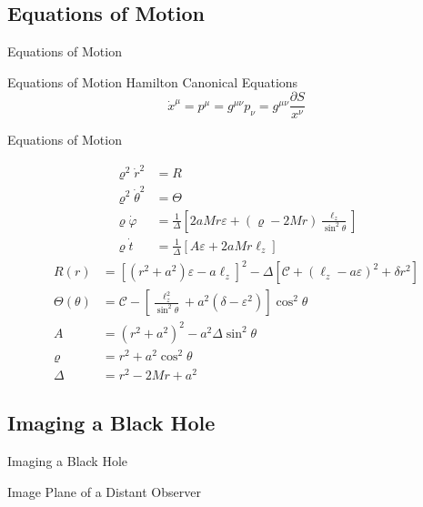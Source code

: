 \documentclass{beamer}
\begin{document}
\begin{darkframes}
\subsection{Equations of Motion}
\begin{frame}
	\huge
    {Equations of Motion}
\end{frame}

\begin{frame}{Equations of Motion}
    Hamilton Canonical Equations
    \pause
    \[ \dot{x}^\mu = p^\mu = g^{\mu \nu} p_\nu = g^{\mu\nu} \frac{\partial S}{ x^\nu} \]
\end{frame}

\begin{frame}{Equations of Motion}
    \footnotesize

    \begin{align*}
    \varrho^2 \dot{r}^2 &= R \\
    \varrho^2 \dot{\theta}^2 &= \Theta \\
    \varrho \dot{\varphi} &= \frac{1}{\Delta} \left[ 2aMr\varepsilon + (\varrho - 2Mr)\frac{\ell_z}{\sin^2 \theta} \right] \\
    \varrho \dot{t} &= \frac{1}{\Delta} \left[ A\varepsilon + 2aMr \ell_z \right]
    \end{align*}
    \pause
    \begin{align*}
    R(r) &= \left[ (r^2 +a^2) \varepsilon - a \ell_z \right]^2 - \Delta \left[\mathcal{C} + (\ell_z - a \varepsilon)^2 + \delta r^2 \right]\\
	\Theta(\theta) &= \mathcal{C} - \left[ \frac{\ell_z^2}{\sin^2 \theta} + a^2 \left(\delta - \varepsilon^2 \right) \right] \cos^2 \theta\\
    A &= (r^2 + a^2)^2 - a^2 \Delta \sin^2 \theta \\
    \varrho  &= r^{2}+a^{2}\cos^{2}\theta \\
    \Delta &= r^{2}-2Mr+a^{2} 
    \end{align*}
\end{frame}

\subsection{Imaging a Black Hole}
\begin{frame}
	\huge
    {Imaging a Black Hole}
\end{frame}

\begin{frame}
	\huge
    {Image Plane of a Distant Observer}
\end{frame}


\end{darkframes}
\end{document}
